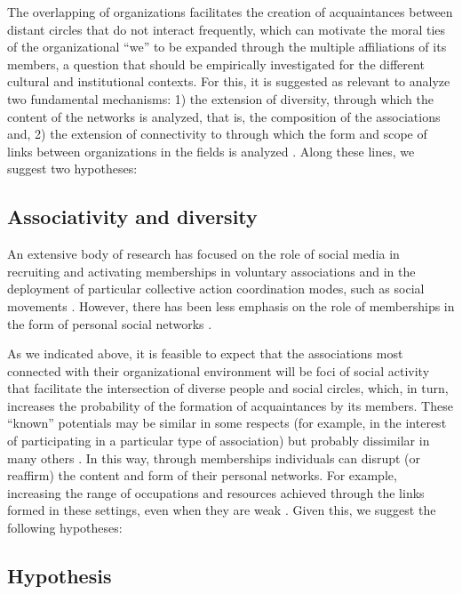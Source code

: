 The overlapping of organizations facilitates the creation of acquaintances between distant circles that do not interact frequently, which can motivate the moral ties of the organizational “we” to be expanded through the multiple affiliations of its members, a question that should be empirically investigated for the different cultural and institutional contexts. For this, it is suggested as relevant to analyze two fundamental mechanisms: 1) the extension of diversity, through which the content of the networks is analyzed, that is, the composition of the associations and, 2) the extension of connectivity to through which the form and scope of links between organizations in the fields is analyzed \parencite{paxton_trust_2018}. Along these lines, we suggest two hypotheses:
\bigskip


\subsection{Associativity and diversity}

An extensive body of research has focused on the role of social media in recruiting and activating memberships in voluntary associations and in the deployment of particular collective action coordination modes, such as social movements \parencite{gould_collective_1993,mcpherson_social_1992,tilly_mobilization_1978}. However, there has been less emphasis on the role of memberships in the form of personal social networks \parencite{benton_uniters_2016,tindall_network_2012}.
\bigskip

As we indicated above, it is feasible to expect that the associations most connected with their organizational environment will be foci of social activity that facilitate the intersection of diverse people and social circles, which, in turn, increases the probability of the formation of acquaintances by its members. These “known” potentials may be similar in some respects (for example, in the interest of participating in a particular type of association) but probably dissimilar in many others \parencite{erickson_social_2003}. In this way, through memberships individuals can disrupt (or reaffirm) the content and form of their personal networks. For example, increasing the range of occupations and resources achieved through the links formed in these settings, even when they are weak \parencite{benton_uniters_2016,magee_civic_2008,son_social_2008}. Given this, we suggest the following hypotheses:

\subsection{Hypothesis} 

